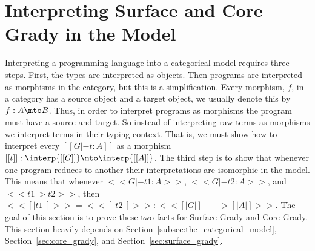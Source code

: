 \section{Interpreting Surface and Core Grady in the Model}
\label{sec:interpreting_surface_grady_in_the_model}

Interpreting a programming language into a categorical model requires
three steps.  First, the types are interpreted as objects.  Then
programs are interpreted as morphisms in the category, but this is a
simplification.  Every morphism, $f$, in a category has a source
object and a target object, we usually denote this by $f : A \mto B$.
Thus, in order to interpret programs as morphisms the program must
have a source and target.  So instead of interpreting raw terms as
morphisms we interpret terms in their typing context.  That is, we
must show how to interpret every $[[G |- t : A]]$ as a morphism $[[t]]
: \interp{[[G]]} \mto \interp{[[A]]}$.  The third step is to show that
whenever one program reduces to another their interpretations are
isomorphic in the model. This means that whenever $<<G |- t1 : A>>$,
$<<G |-t2 : A>>$, and $<<t1 ~> t2>>$, then $<< [|t1|] >> = << [|t2|] >>
: << [| G |] --> [| A |] >>$.  The goal of this section is to prove
these two facts for Surface Grady and Core Grady.  This section
heavily depends on Section~\ref{subsec:the_categorical_model},
Section~\ref{sec:core_grady}, and Section~\ref{sec:surface_grady}.

